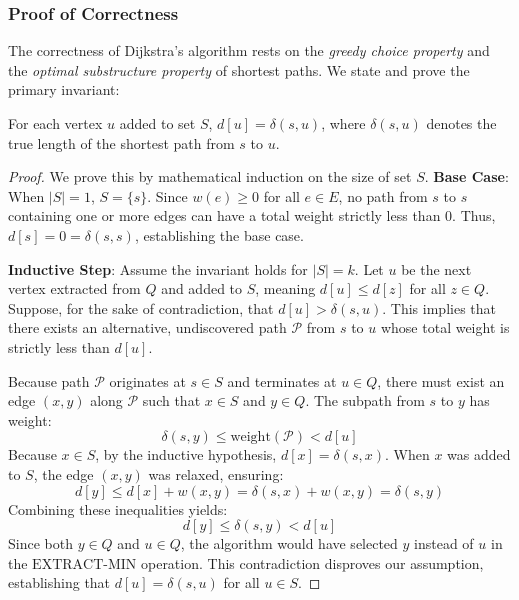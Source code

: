 \subsubsection{Proof of Correctness}
The correctness of Dijkstra's algorithm rests on the \emph{greedy choice property} and the \emph{optimal substructure property} of shortest paths. We state and prove the primary invariant:

\begin{theorem}
For each vertex $u$ added to set $S$, $d[u] = \delta(s, u)$, where $\delta(s, u)$ denotes the true length of the shortest path from $s$ to $u$.
\end{theorem}

\begin{proof}
We prove this by mathematical induction on the size of set $S$.
\textbf{Base Case}: When $|S| = 1$, $S = \{s\}$. Since $w(e) \ge 0$ for all $e \in E$, no path from $s$ to $s$ containing one or more edges can have a total weight strictly less than $0$. Thus, $d[s] = 0 = \delta(s, s)$, establishing the base case.

\textbf{Inductive Step}: Assume the invariant holds for $|S| = k$. Let $u$ be the next vertex extracted from $Q$ and added to $S$, meaning $d[u] \le d[z]$ for all $z \in Q$. Suppose, for the sake of contradiction, that $d[u] > \delta(s, u)$. This implies that there exists an alternative, undiscovered path $\mathcal{P}$ from $s$ to $u$ whose total weight is strictly less than $d[u]$.

Because path $\mathcal{P}$ originates at $s \in S$ and terminates at $u \in Q$, there must exist an edge $(x, y)$ along $\mathcal{P}$ such that $x \in S$ and $y \in Q$. The subpath from $s$ to $y$ has weight:
\begin{equation}
    \delta(s, y) \le \text{weight}(\mathcal{P}) < d[u]
\end{equation}
Because $x \in S$, by the inductive hypothesis, $d[x] = \delta(s, x)$. When $x$ was added to $S$, the edge $(x, y)$ was relaxed, ensuring:
\begin{equation}
    d[y] \le d[x] + w(x, y) = \delta(s, x) + w(x, y) = \delta(s, y)
\end{equation}
Combining these inequalities yields:
\begin{equation}
    d[y] \le \delta(s, y) < d[u]
\end{equation}
Since both $y \in Q$ and $u \in Q$, the algorithm would have selected $y$ instead of $u$ in the $\text{EXTRACT-MIN}$ operation. This contradiction disproves our assumption, establishing that $d[u] = \delta(s, u)$ for all $u \in S$.
\end{proof}

